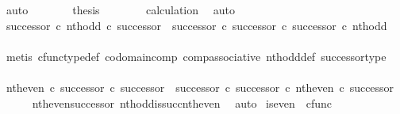 \begin{isabellebody}
\ auto\isanewline
\ \ \ \ \isamarkupfalse%
\ \isamarkupfalse%
\ {\isacharquery}{\kern0pt}thesis\isanewline
\ \ \ \ \ \ \isamarkupfalse%
\ calculation\ \isamarkupfalse%
\ auto\isanewline
\ \ \isamarkupfalse%
\isanewline
\isanewline
\ \ \isamarkupfalse%
\ {\isachardoublequoteopen}{\isacharparenleft}{\kern0pt}successor\ {\isasymcirc}\isactrlsub c\ nth{\isacharunderscore}{\kern0pt}odd{\isacharparenright}{\kern0pt}\ {\isasymcirc}\isactrlsub c\ successor\ {\isacharequal}{\kern0pt}\ {\isacharparenleft}{\kern0pt}successor\ {\isasymcirc}\isactrlsub c\ successor{\isacharparenright}{\kern0pt}\ {\isasymcirc}\isactrlsub c\ successor\ {\isasymcirc}\isactrlsub c\ nth{\isacharunderscore}{\kern0pt}odd{\isachardoublequoteclose}\isanewline
\ \ \ \ \isamarkupfalse%
\ {\isacharparenleft}{\kern0pt}metis\ cfunc{\isacharunderscore}{\kern0pt}type{\isacharunderscore}{\kern0pt}def\ codomain{\isacharunderscore}{\kern0pt}comp\ comp{\isacharunderscore}{\kern0pt}associative\ nth{\isacharunderscore}{\kern0pt}odd{\isacharunderscore}{\kern0pt}def{}\ successor{\isacharunderscore}{\kern0pt}type{\isacharparenright}{\kern0pt}\isanewline
\ \ \isamarkupfalse%
\ \isamarkupfalse%
\ {\isachardoublequoteopen}{\isacharparenleft}{\kern0pt}nth{\isacharunderscore}{\kern0pt}even\ {\isasymcirc}\isactrlsub c\ successor{\isacharparenright}{\kern0pt}\ {\isasymcirc}\isactrlsub c\ successor\ {\isacharequal}{\kern0pt}\ {\isacharparenleft}{\kern0pt}successor\ {\isasymcirc}\isactrlsub c\ successor{\isacharparenright}{\kern0pt}\ {\isasymcirc}\isactrlsub c\ nth{\isacharunderscore}{\kern0pt}even\ {\isasymcirc}\isactrlsub c\ successor{\isachardoublequoteclose}\isanewline
\ \ \ \ \isamarkupfalse%
\ nth{\isacharunderscore}{\kern0pt}even{\isacharunderscore}{\kern0pt}successor{}\ nth{\isacharunderscore}{\kern0pt}odd{\isacharunderscore}{\kern0pt}is{\isacharunderscore}{\kern0pt}succ{\isacharunderscore}{\kern0pt}nth{\isacharunderscore}{\kern0pt}even\ \isamarkupfalse%
\ auto\isanewline
{}\isamarkupfalse%
%
\endisatagproof
{\isafoldproof}%
%
\isadelimproof
%
\endisadelimproof
%
\isadelimdocument
%
\endisadelimdocument
%
\isatagdocument
%
\isamarkuptrue%
%
\endisatagdocument
{\isafolddocument}%
%
\isadelimdocument
%
\endisadelimdocument
{}\isamarkupfalse%
\ is{\isacharunderscore}{\kern0pt}even\ {\isacharcolon}{\kern0pt}{\isacharcolon}{\kern0pt}\ {\isachardoublequoteopen}cfunc{\isachardoublequoteclose}\ \isanewline

\end{isabellebody}

